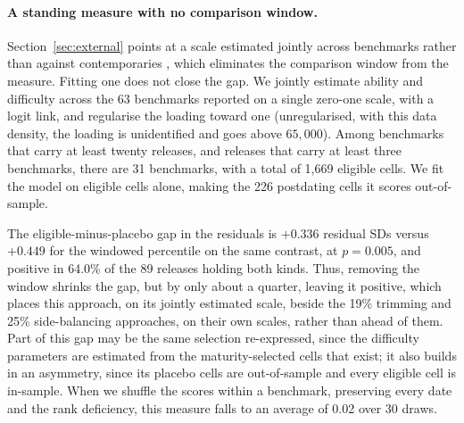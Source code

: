 \documentclass{article}
\begin{document}
\paragraph{A standing measure with no comparison window.}
Section~\ref{sec:external} points at a scale estimated jointly across benchmarks rather than against contemporaries \citep{epoch2026rosetta}, which eliminates the comparison window from the measure. Fitting one does not close the gap. We jointly estimate ability and difficulty across the 63 benchmarks reported on a single zero-one scale, with a logit link, and regularise the loading toward one (unregularised, with this data density, the loading is unidentified and goes above $65{,}000$). Among benchmarks that carry at least twenty releases, and releases that carry at least three benchmarks, there are 31 benchmarks, with a total of 1,669 eligible cells. We fit the model on eligible cells alone, making the 226 postdating cells it scores out-of-sample.

The eligible-minus-placebo gap in the residuals is $+0.336$ residual SDs versus $+0.449$ for the windowed percentile on the same contrast, at $p = 0.005$, and positive in 64.0\% of the 89 releases holding both kinds. Thus, removing the window shrinks the gap, but by only about a quarter, leaving it positive, which places this approach, on its jointly estimated scale, beside the 19\% trimming and 25\% side-balancing approaches, on their own scales, rather than ahead of them. Part of this gap may be the same selection re-expressed, since the difficulty parameters are estimated from the maturity-selected cells that exist; it also builds in an asymmetry, since its placebo cells are out-of-sample and every eligible cell is in-sample. When we shuffle the scores within a benchmark, preserving every date and the rank deficiency, this measure falls to an average of 0.02 over 30 draws.
\end{document}

